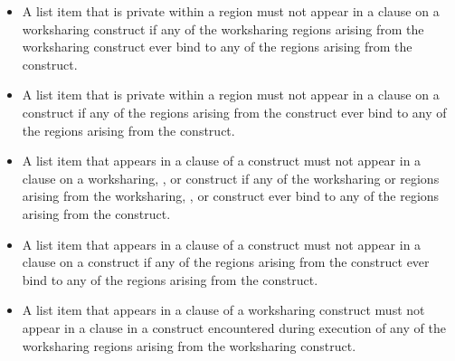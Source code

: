 \begin{itemize}
\item A list item that is private within a  region must
      not appear in a  clause on a worksharing construct
      if any of the worksharing regions arising from the worksharing construct 
      ever bind to any of the  regions arising from the 
       construct.
\item A list item that is private within a  region must not 
      appear in a  clause on a  construct 
      if any of the  regions arising from the  
      construct ever bind to any of the  regions arising from the 
       construct.
\item A list item that appears in a  clause of a 
      construct must not appear in a  clause on a worksharing, 
      , or  construct if any of the worksharing or 
       regions arising from the worksharing, , or 
       construct ever bind to any of the  
      regions arising from the  construct.
\item A list item that appears in a  clause of a  
      construct must not appear in a  clause on a 
       construct if any of the  regions arising 
      from the  construct ever bind to any of
      the  regions arising from the  construct.
\item A list item that appears in a  clause of a worksharing 
      construct must not appear in a  clause in a  
      construct encountered during execution of any of the worksharing regions 
      arising from the worksharing construct.



\end{itemize}



